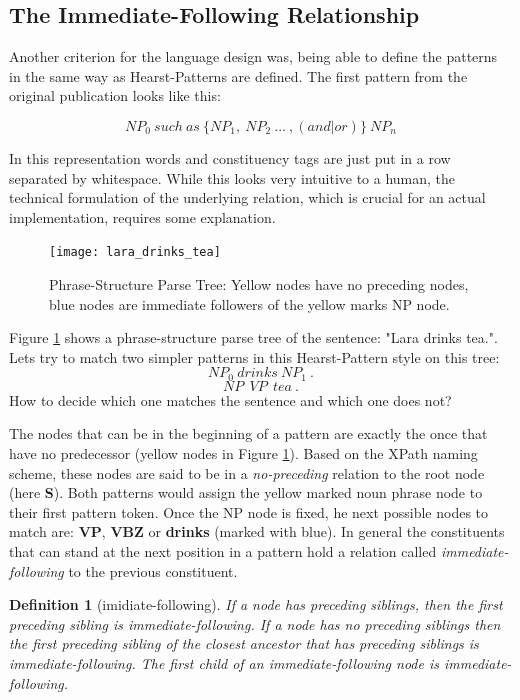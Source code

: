 \documentclass[english]{article}
\newtheorem*{definition}{Definition}
\begin{document}
\subsection{The Immediate-Following Relationship}

Another criterion for the language design was, being able to define the patterns in the same way as Hearst-Patterns \cite{hearst_automatic_1992} are defined. The first pattern from the original publication looks like this:

\[ NP_0\ such\ as\ \{NP_1,\ NP_2\ ...\ ,(and|or)\}\ NP_n \]

In this representation words and constituency tags are just put in a row separated by whitespace. While this looks very intuitive to a human, the technical formulation of the underlying relation, which is crucial for an actual implementation, requires some explanation.

\label{ssec:imidiate-following}

\begin{figure}
\centering
\texttt{[image: lara\_drinks\_tea]}
\caption{Phrase-Structure Parse Tree: Yellow nodes have no preceding nodes, blue nodes are immediate followers of the yellow marks NP node.}
\label{fig:lara-drinks-tea}
\end{figure}


Figure \ref{fig:lara-drinks-tea} shows a phrase-structure parse tree of the sentence: "Lara drinks tea.". Lets try to match two simpler patterns in this Hearst-Pattern style on this tree:
\[NP_0\ drinks\ NP_1\ .\]
\[NP\ \ VP\ \ tea\ .\]
How to decide which one matches the sentence and which one does not?  

The nodes that can be in the beginning of a pattern are exactly the once that have no predecessor (yellow nodes in Figure \ref{fig:lara-drinks-tea}). Based on the XPath naming scheme, these nodes are said to be in a \textit{no-preceding} relation to the root node (here \textbf{S}). Both patterns would assign the yellow marked noun phrase node to their first pattern token. Once the NP node is fixed, he next possible nodes to match are: \textbf{VP}, \textbf{VBZ} or \textbf{drinks} (marked with blue). In general the constituents that can stand at the next position in a pattern hold a relation called \textit{immediate-following} to the previous constituent.

\begin{definition}[imidiate-following]
 If a node has preceding siblings, then the first preceding sibling is immediate-following. If a node has no preceding siblings then the first preceding sibling of the closest ancestor that has preceding siblings is immediate-following. The first child of an immediate-following node is immediate-following.
\end{definition}
\end{document}
